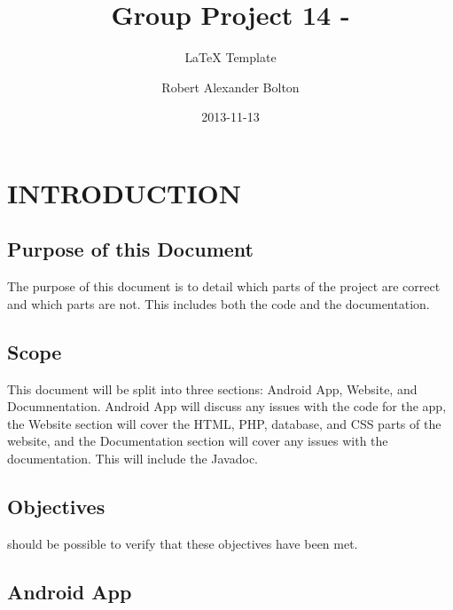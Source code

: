 \documentclass{project}
\begin{document}
\title{Group Project 14 -}

\subtitle{LaTeX Template}
\author{Robert Alexander Bolton}     
\date{2013-11-13}

\maketitle
\tableofcontents
\newpage


\section{INTRODUCTION}

\subsection{Purpose of this Document}
The purpose of this document is to detail which parts of the project are correct
and which parts are not. This includes both the code and the documentation. \cite{se.qa.03}

\subsection{Scope}
This document will be split into three sections: Android App, Website, and Documnentation.
Android App will discuss any issues with the code for the app, the Website section will cover the HTML,
PHP, database, and CSS parts of the website, and the Documentation section will cover any issues with the
documentation. This will include the Javadoc. \cite{se.qa.03}

\subsection{Objectives}
%
%
%
%
should be possible to verify that these objectives have been met. \cite{se.qa.03}


\subsection{Android App}
\end{document}
